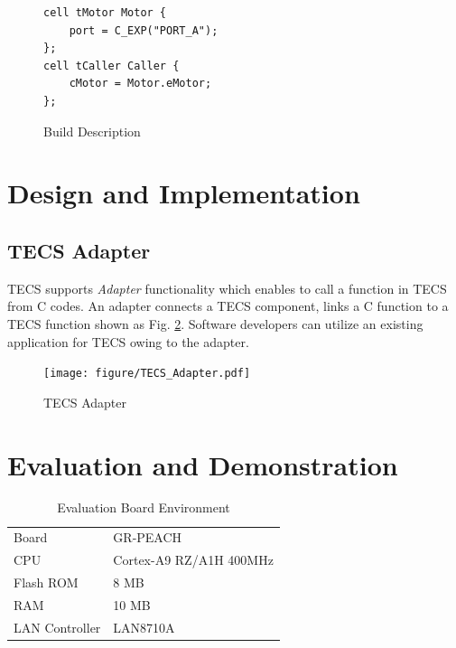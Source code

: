 \documentclass[conference]{IEEEtran/IEEEtran}
\begin{document}
\begin{description}
\begin{figure}[t]
\centering
\begin{lstlisting}
cell tMotor Motor {
    port = C_EXP("PORT_A");
};
cell tCaller Caller {
    cMotor = Motor.eMotor;
};
\end{lstlisting}
\caption{Build Description}
\label{build}
\end{figure}

\end{description}

\section{Design and Implementation}
\label{sec:Design and Implementation}


\subsection{TECS Adapter}

TECS supports {\it Adapter} functionality which enables to call a function in TECS from C codes.
An adapter connects a TECS component, links a C function to a TECS function shown as Fig. \ref{fig:TECS_Adapter}.
Software developers can utilize an existing application for TECS owing to the adapter.

\begin{figure}[t]
    \centering
    \texttt{[image: figure/TECS\_Adapter.pdf]}
    \caption{TECS Adapter}
    \label{fig:TECS_Adapter}
\end{figure}




\section{Evaluation and Demonstration}
\label{sec:Evaluation and Demonstration}

\begin{table}[t]
    \centering
    \caption{Evaluation Board Environment}
    \begin{tabular}{l|l}
        \hline\hline
        Board           &   GR-PEACH                \\
        CPU             &   Cortex-A9 RZ/A1H 400MHz \\
        Flash ROM       &   8 MB                    \\
        RAM             &   10 MB                   \\
        LAN Controller  &   LAN8710A                \\
        \hline
    \end{tabular}
    \label{tab:Evaluation_Board_Environment}
\end{table}
\end{document}
